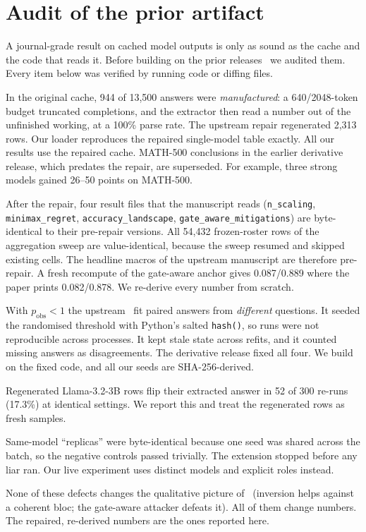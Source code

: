 \section{Audit of the prior artifact}\label{sec:audit}

A journal-grade result on cached model outputs is only as sound as the cache and the code that reads it. Before building on the prior releases~\citep{das2026aip,nabidnur2026bucket} we audited them. Every item below was verified by running code or diffing files.

\begin{description}[style=unboxed,leftmargin=0pt]
\item[Truncation (X3).] In the original cache, 944 of 13{,}500 answers were \emph{manufactured}: a 640/2048-token budget truncated completions, and the extractor then read a number out of the unfinished working, at a 100\% parse rate. The upstream repair regenerated 2{,}313 rows. Our loader reproduces the repaired single-model table exactly. All our results use the repaired cache. MATH-500 conclusions in the earlier derivative release, which predates the repair, are superseded. For example, three strong models gained 26--50 points on MATH-500.
\item[Incomplete recompute.] After the repair, four result files that the manuscript reads (\texttt{n\_scaling}, \texttt{minimax\_regret}, \texttt{accuracy\_landscape}, \texttt{gate\_aware\_mitigations}) are byte-identical to their pre-repair versions. All 54{,}432 frozen-roster rows of the aggregation sweep are value-identical, because the sweep resumed and skipped existing cells. The headline macros of the upstream manuscript are therefore pre-repair. A fresh recompute of the gate-aware anchor gives 0.087/0.889 where the paper prints 0.082/0.878. We re-derive every number from scratch.
\item[Code defects.] With $p_{\text{obs}}<1$ the upstream \aip\ fit paired answers from \emph{different} questions. It seeded the randomised threshold with Python's salted \texttt{hash()}, so runs were not reproducible across processes. It kept stale state across refits, and it counted missing answers as disagreements. The derivative release fixed all four. We build on the fixed code, and all our seeds are SHA-256-derived.
\item[Nondeterminism.] Regenerated Llama-3.2-3B rows flip their extracted answer in 52 of 300 re-runs (17.3\%) at identical settings. We report this and treat the regenerated rows as fresh samples.
\item[Pipeline extension (MX).] Same-model ``replicas'' were byte-identical because one seed was shared across the batch, so the negative controls passed trivially. The extension stopped before any liar ran. Our live experiment uses distinct models and explicit roles instead.
\end{description}
None of these defects changes the qualitative picture of \aip\ (inversion helps against a coherent bloc; the gate-aware attacker defeats it). All of them change numbers. The repaired, re-derived numbers are the ones reported here.
